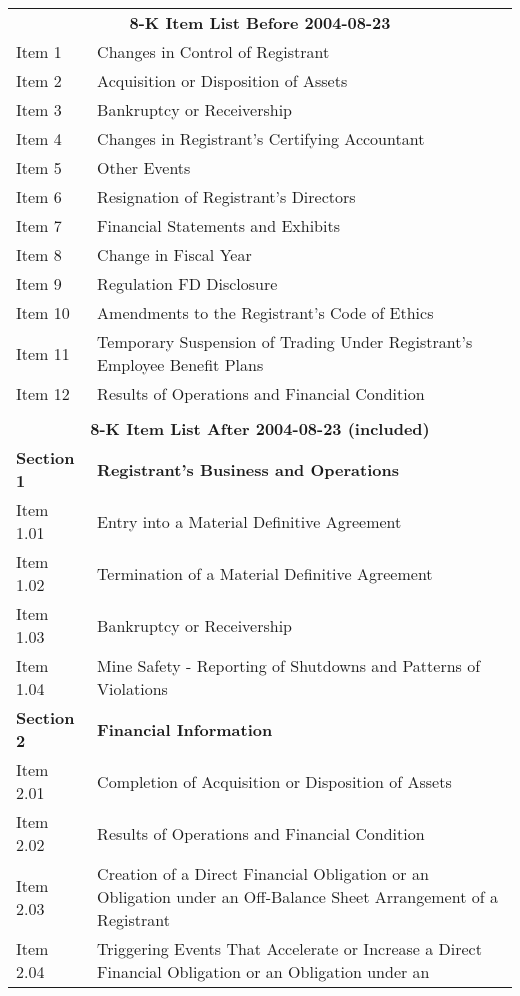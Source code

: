 \begin{table}[H]
  \centering
    \begin{tabular}{ll}
    \multicolumn{2}{c}{\textbf{8-K Item List Before 2004-08-23}} \\
    Item 1 & Changes in Control of Registrant \\
    Item 2 & Acquisition or Disposition of Assets \\
    Item 3 & Bankruptcy or Receivership \\
    Item 4 & Changes in Registrant's Certifying Accountant \\
    Item 5 & Other Events \\
    Item 6 & Resignation of Registrant's Directors \\
    Item 7 & Financial Statements and Exhibits \\
    Item 8 & Change in Fiscal Year \\
    Item 9 & Regulation FD Disclosure \\
    Item 10 & Amendments to the Registrant's Code of Ethics \\
    Item 11 & Temporary Suspension of Trading Under Registrant's Employee Benefit Plans \\
    Item 12 & Results of Operations and Financial Condition \\
      &  \\
    \multicolumn{2}{c}{\textbf{8-K Item List After 2004-08-23 (included)}} \\
    \textbf{Section 1} & \textbf{Registrant's Business and Operations} \\
    Item 1.01 & Entry into a Material Definitive Agreement \\
    Item 1.02 & Termination of a Material Definitive Agreement \\
    Item 1.03 & Bankruptcy or Receivership \\
    Item 1.04 & Mine Safety - Reporting of Shutdowns and Patterns of Violations \\
    \textbf{Section 2} & \textbf{Financial Information} \\
    Item 2.01 & Completion of Acquisition or Disposition of Assets \\
    Item 2.02 & Results of Operations and Financial Condition \\
    Item 2.03 & Creation of a Direct Financial Obligation or an Obligation under an Off-Balance Sheet Arrangement of a Registrant \\
    Item 2.04 & Triggering Events That Accelerate or Increase a Direct Financial Obligation or an Obligation under an \\

\end{tabular}
\end{table}
